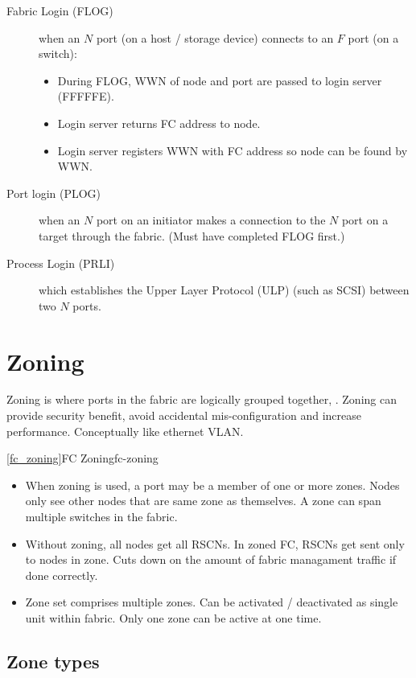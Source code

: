 \documentclass[slides]{pgnotes}
\begin{document}
\begin{description}
\item[Fabric Login (FLOG)]
when an \(N\) port (on a host / storage device) connects to an \(F\)
port (on a switch):

\begin{itemize}
\item
  During FLOG, WWN of node and port are passed to login server (FFFFFE).
\item
  Login server returns FC address to node.
\item
  Login server registers WWN with FC address so node can be found by
  WWN.
\end{itemize}
\item[Port login (PLOG)]
when an \(N\) port on an initiator makes a connection to the \(N\) port
on a target through the fabric. (Must have completed FLOG first.)
\item[Process Login (PRLI)]
which establishes the Upper Layer Protocol (ULP) (such as SCSI) between
two \(N\) ports.
\end{description}

\section{Zoning}
\label{sec:zoning}

Zoning is where ports in the fabric are logically grouped together, .
Zoning can provide security benefit, avoid accidental mis-configuration
and increase performance. Conceptually like ethernet VLAN.

\autoref{fc_zoning}{FC Zoning}{fc-zoning}

\begin{itemize}
\item
  When zoning is used, a port may be a member of one or more zones.
  Nodes only see other nodes that are same zone as themselves. A zone
  can span multiple switches in the fabric.
\item
  Without zoning, all nodes get all RSCNs. In zoned FC, RSCNs get sent
  only to nodes in zone. Cuts down on the amount of fabric managament
  traffic if done correctly.
\item
  Zone set comprises multiple zones. Can be activated / deactivated as
  single unit within fabric. Only one zone can be active at one time.
\end{itemize}

\subsection{Zone types}
\label{sec:zone-types}
\end{document}
